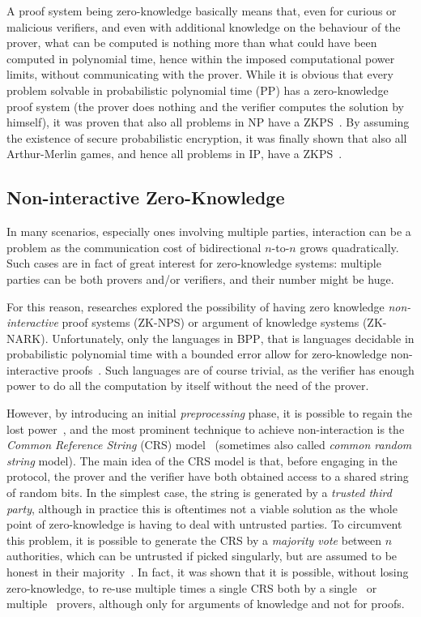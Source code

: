 A proof system being zero-knowledge basically means that, even for curious or malicious verifiers,
and even with additional knowledge on the behaviour of the prover, what can be computed is nothing 
more than what could have been computed in polynomial time, hence within the imposed computational 
power limits, without communicating with the prover.
While it is obvious that every problem solvable in probabilistic polynomial time 
(\textsc{PP}) has a zero-knowledge proof system (the prover does nothing and the verifier computes 
the solution by himself), it was proven that also all problems in \textsc{NP} have a 
ZKPS~\cite{GoldreichMW1991}. 
By assuming the existence of secure probabilistic encryption, it was finally shown that also 
all Arthur-Merlin games, and hence all problems in \textsc{IP}, have a ZKPS~\cite{BenorGGHKMR1990}.

\subsection{Non-interactive Zero-Knowledge}\label{subsec:nizk}
In many scenarios, especially ones involving multiple parties, interaction can be a problem as
the communication cost of bidirectional \(n\)-to-\(n\) grows quadratically.
Such cases are in fact of great interest for zero-knowledge systems: multiple parties can be 
both provers and/or verifiers, and their number might be huge.

For this reason, researches explored the possibility of having zero knowledge \emph{non-interactive} 
proof systems (ZK-NPS) or argument of knowledge systems (ZK-NARK).
Unfortunately, only the languages in \textsc{BPP}, that is languages decidable in 
probabilistic polynomial time with a bounded error allow for zero-knowledge non-interactive 
proofs~\cite{Oren1987,GoldreichK1996}. Such languages are of course trivial, as the verifier has 
enough power to do all the computation by itself without the need of the prover.

However, by introducing an initial \emph{preprocessing} phase, it is possible to regain the lost 
power~\cite{SantisMP1990}, and the most prominent technique to achieve non-interaction is the 
\emph{Common Reference String} (CRS) model~\cite{BlumFM1988} (sometimes also called 
\emph{common random string} model).
The main idea of the CRS model is that, before engaging in the protocol, the prover and 
the verifier have both obtained access to a shared string of random bits. 
In the simplest case, the string is generated by a \emph{trusted third party}, although in 
practice this is oftentimes not a viable solution as the whole point of zero-knowledge is having 
to deal with untrusted parties. 
To circumvent this problem, it is possible to generate the CRS by a \emph{majority vote}
between \(n\) authorities, which can be untrusted if picked singularly, but are assumed to be 
honest in their majority~\cite{GrothO2006}.
In fact, it was shown that it is possible, without losing zero-knowledge, to re-use multiple times 
a single CRS both by a single~\cite{BlumSMP1991} or multiple~\cite{FeigeLS1990} provers, although 
only for arguments of knowledge and not for proofs.

